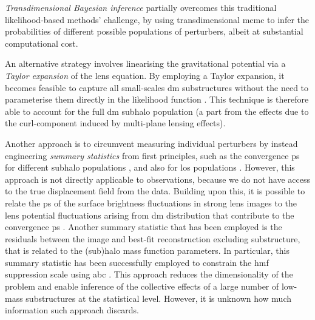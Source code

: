 \emph{Transdimensional Bayesian inference} \citep{Brewer:2015yya,Daylan:2017kfh} partially overcomes this traditional likelihood-based methods' challenge, by using transdimensional \gls*{mcmc} to infer the probabilities of different possible populations of perturbers, albeit at substantial computational cost. 

An alternative strategy involves linearising the gravitational potential via a \emph{Taylor expansion} of the lens equation. By employing a Taylor expansion, it becomes feasible to capture all small-scales \gls*{dm} substructures without the need to parameterise them directly in the likelihood function \citep{Vegetti:2008eg, Koopmans:2005nr, Galan:2022ifd}. This technique is therefore able to account for the full \gls*{dm} subhalo population (a part from the effects due to the curl-component induced by multi-plane lensing effects).

Another approach is to circumvent measuring individual perturbers by instead engineering \emph{summary statistics} from first principles, such as the convergence \gls*{ps} for different subhalo populations  \cite{DiazRivero:2017xkd, DiazRivero:2018aa, Brennan:2018jhq}, and also for \gls*{los} populations \cite{CaganSengul:2020nat}. However, this approach is not directly applicable to observations, because we do not have access to the true displacement field from the data. Building upon this, it is possible to relate the \gls*{ps} of the surface brightness fluctuations in strong lens images to the lens potential fluctuations arising from \gls*{dm} distribution that contribute to the convergence \gls*{ps} \cite{Chatterjee:2017orx, Cyr-Racine:2019aa, Bayer:2018vhy}. Another summary statistic that has been employed is the residuals between the image and best-fit reconstruction excluding substructure, that is related to the (sub)halo mass function parameters. In particular, this summary statistic has been successfully employed to constrain the \gls*{hmf} suppression scale using \gls*{abc}  \cite{Birrer:2017rpp, He:2020rkj}. This approach reduces the dimensionality of the problem and enable inference of the collective effects of a large number of low-mass substructures at the statistical level. However, it is unknown how much information such approach discards. 


